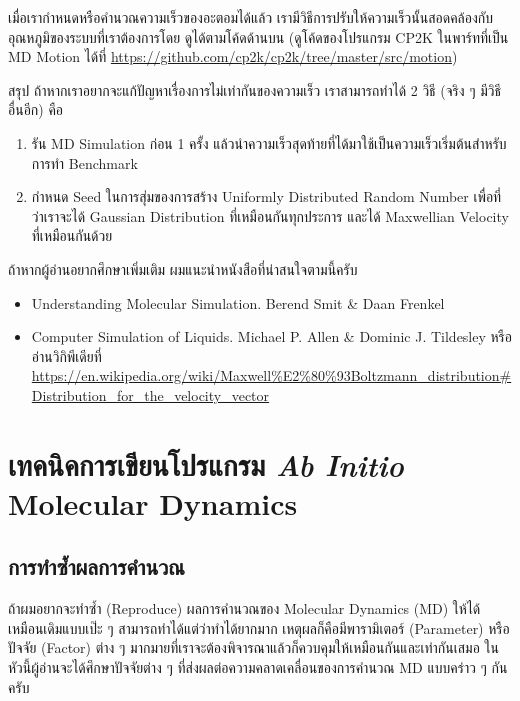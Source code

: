 \vspace{5pt}

\noindent เมื่อเรากำหนดหรือคำนวณความเร็วของอะตอมได้แล้ว เรามีวิธีการปรับให้ความเร็วนั้นสอดคล้องกับอุณหภูมิของระบบที่เราต้องการโดย%
ดูได้ตามโค้ดด้านบน (ดูโค้ดของโปรแกรม CP2K ในพาร์ทที่เป็น MD Motion ได้ที่
\url{https://github.com/cp2k/cp2k/tree/master/src/motion})

สรุป ถ้าหากเราอยากจะแก้ปัญหาเรื่องการไม่เท่ากันของความเร็ว เราสามารถทำได้ 2 วิธี (จริง ๆ มีวิธีอื่นอีก) คือ

\begin{enumerate}[topsep=0pt,noitemsep]
  \setlength\itemsep{0.5em}
  \item รัน MD Simulation ก่อน 1 ครั้ง แล้วนำความเร็วสุดท้ายที่ได้มาใช้เป็นความเร็วเริ่มต้นสำหรับการทำ Benchmark

  \item กำหนด Seed ในการสุ่มของการสร้าง Uniformly Distributed Random Number เพื่อที่ว่าเราจะได้ Gaussian Distribution
        ที่เหมือนกันทุกประการ และได้ Maxwellian Velocity ที่เหมือนกันด้วย
\end{enumerate}

ถ้าหากผู้อ่านอยากศึกษาเพิ่มเติม ผมแนะนำหนังสือที่น่าสนใจตามนี้ครับ

\begin{itemize}[topsep=0pt,noitemsep]
  \setlength\itemsep{0.5em}
  \item Understanding Molecular Simulation. Berend Smit \& Daan Frenkel

  \item Computer Simulation of Liquids.  Michael P. Allen \& Dominic J. Tildesley
        หรืออ่านวิกิพีเดียที่
        \url{https://en.wikipedia.org/wiki/Maxwell%E2%80%93Boltzmann_distribution#Distribution_for_the_velocity_vector}
\end{itemize}

\section{เทคนิคการเขียนโปรแกรม \textit{Ab Initio} Molecular Dynamics}

\subsection{การทำซ้ำผลการคำนวณ}

ถ้าผมอยากจะทำซ้ำ (Reproduce) ผลการคำนวณของ Molecular Dynamics (MD) ให้ได้เหมือนเดิมแบบเป๊ะ ๆ สามารถทำได้แต่ว่าทำได้ยากมาก
เหตุผลก็คือมีพารามิเตอร์ (Parameter) หรือปัจจัย (Factor) ต่าง ๆ มากมายที่เราจะต้องพิจารณาแล้วก็ควบคุมให้เหมือนกันและเท่ากันเสมอ
ในหัวนี้ผู้อ่านจะได้ศึกษาปัจจัยต่าง ๆ ที่ส่งผลต่อความคลาดเคลื่อนของการคำนวณ MD แบบคร่าว ๆ กันครับ

